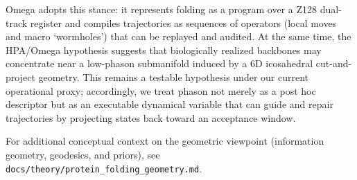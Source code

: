 Omega adopts this stance: it represents folding as a program over a Z128 dual-track register and compiles trajectories as sequences of operators (local moves and macro ‘wormholes’) that can be replayed and audited. At the same time, the HPA/Omega hypothesis suggests that biologically realized backbones may concentrate near a low-phason submanifold induced by a 6D icosahedral cut-and-project geometry. This remains a testable hypothesis under our current operational proxy; accordingly, we treat phason not merely as a post hoc descriptor but as an executable dynamical variable that can guide and repair trajectories by projecting states back toward an acceptance window.

For additional conceptual context on the geometric viewpoint (information geometry, geodesics, and priors), see \texttt{docs/theory/protein\_folding\_geometry.md}.
